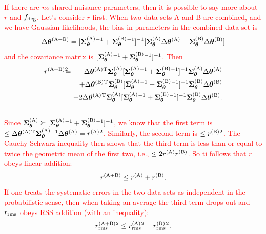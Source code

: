 \documentclass[usenatbib]{mnras}
\newcommand{\changetext}[1]{\textcolor{red}{#1}}
\begin{document}
\changetext{If there are {\em no} shared nuisance parameters, then it is possible to say more about $r$ and $f_{\rm deg}$. Let's consider $r$ first. When two data sets A and B are combined, and we have Gaussian likelihoods, the bias in parameters in the combined data set is
\begin{equation}
\Delta{\boldsymbol\theta}^{(\rm A+B)} =
[{\boldsymbol\Sigma}_{\boldsymbol\theta}^{\rm(A)}{^{-1}}
+{\boldsymbol\Sigma}_{\boldsymbol\theta}^{\rm(B)}{^{-1}}]^{-1}
[{\boldsymbol\Sigma}_{\boldsymbol\theta}^{\rm(A)} \Delta{\boldsymbol\theta}^{(\rm A)} +
{\boldsymbol\Sigma}_{\boldsymbol\theta}^{\rm(B)} \Delta{\boldsymbol\theta}^{(\rm B)}]
\end{equation}
and the covariance matrix is $[{\boldsymbol\Sigma}_{\boldsymbol\theta}^{\rm(A)}{^{-1}} + {\boldsymbol\Sigma}_{\boldsymbol\theta}^{\rm(B)}{^{-1}}]^{-1}$. Then
\begin{eqnarray}
r^{\rm(A+B)}{^2}\!\!\!\! &=& \!\!\!\!
\Delta{\boldsymbol\theta}^{(\rm A)}{^{\rm T}} {\boldsymbol\Sigma}_{\boldsymbol\theta}^{\rm(A)} 
 [{\boldsymbol\Sigma}_{\boldsymbol\theta}^{\rm(A)}{^{-1}}
+{\boldsymbol\Sigma}_{\boldsymbol\theta}^{\rm(B)}{^{-1}}]^{-1}
{\boldsymbol\Sigma}_{\boldsymbol\theta}^{\rm(A)} \Delta{\boldsymbol\theta}^{(\rm A)}
\nonumber \\
&& \!\!\!\!
+
\Delta{\boldsymbol\theta}^{(\rm B)}{^{\rm T}} {\boldsymbol\Sigma}_{\boldsymbol\theta}^{\rm(B)} 
 [{\boldsymbol\Sigma}_{\boldsymbol\theta}^{\rm(A)}{^{-1}}
+{\boldsymbol\Sigma}_{\boldsymbol\theta}^{\rm(B)}{^{-1}}]^{-1}
{\boldsymbol\Sigma}_{\boldsymbol\theta}^{\rm(B)} \Delta{\boldsymbol\theta}^{(\rm B)}
\nonumber \\
&& \!\!\!\!
+ 2
\Delta{\boldsymbol\theta}^{(\rm A)}{^{\rm T}} {\boldsymbol\Sigma}_{\boldsymbol\theta}^{\rm(A)} 
 [{\boldsymbol\Sigma}_{\boldsymbol\theta}^{\rm(A)}{^{-1}}
+{\boldsymbol\Sigma}_{\boldsymbol\theta}^{\rm(B)}{^{-1}}]^{-1}
{\boldsymbol\Sigma}_{\boldsymbol\theta}^{\rm(B)} \Delta{\boldsymbol\theta}^{(\rm B)}.
\nonumber \\ &&
\end{eqnarray}
Since ${\boldsymbol\Sigma}_{\boldsymbol\theta}^{\rm(A)} \succeq [{\boldsymbol\Sigma}_{\boldsymbol\theta}^{\rm(A)}{^{-1}}
+{\boldsymbol\Sigma}_{\boldsymbol\theta}^{\rm(B)}{^{-1}}]^{-1}$, we know that the first term is $\le \Delta{\boldsymbol\theta}^{(\rm A)}{^{\rm T}} {\boldsymbol\Sigma}_{\boldsymbol\theta}^{\rm(A)}{^{-1}}\Delta{\boldsymbol\theta}^{(\rm A)} = r^{\rm(A)}{^2}$.
Similarly, the second term is $\le r^{\rm(B)}{^2}$. The Cauchy-Schwarz inequality then shows that the third term is less than or equal to twice the geometric mean of the first two, i.e., $\le 2r^{\rm(A)} r^{\rm(B)}$. So ti follows that $r$ obeys linear addition:
\begin{equation}
r^{\rm(A+B)} \le r^{\rm(A)} + r^{\rm(B)}.
\end{equation}
If one treats the systematic errors in the two data sets as independent in the probabilistic sense, then when taking an average the third term drops out and $r_{\rm rms}$ obeys RSS addition (with an inequality):
\begin{equation}
r_{\rm rms}^{\rm(A+B)}{^2} \le r_{\rm rms}^{\rm(A)}{^2} + r_{\rm rms}^{\rm(B)}{^2}.
\end{equation}
}
\end{document}
